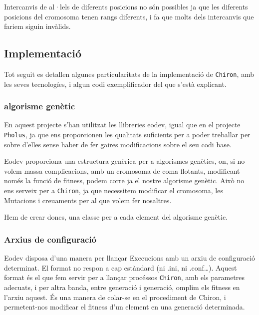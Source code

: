 Intercanvis de al·lels de diferents posicions no són possibles ja que les
diferents posicions del cromosoma tenen rangs diferents, i fa que molts dels
intercanvis que fariem siguin invàlids.


\subsection{Implementació} %
	\label{sub:Implementacio}

Tot seguit es detallen algunes particularitats de la implementació de
\texttt{Chiron}, amb les seves tecnologíes, i algun codi exemplificador del que
s'està explicant.

\subsubsection{algorisme genètic} %
\label{ssub:algorisme genetic}

En aquest projecte s'han utilitzat les llibreries eodev, igual que en el
projecte \texttt{Pholus}, ja que ens proporcionen les qualitats suficients per a
poder treballar per sobre d'elles sense haber de fer gaires modificacions sobre
el seu codi base.

Eodev proporciona una estructura genèrica per a algorismes genètics, on, si no
volem massa complicacions, amb un cromosoma de coma flotants, modificant només
la funció de fitness, podem corre ja el nostre algorisme genètic.  Això no ens
serveix per a \texttt{Chiron}, ja que necessitem modificar el cromosoma, les
Mutacions i creuaments per al que volem fer nosaltres.

Hem de crear doncs, una classe per a cada element del algorisme genètic.



\subsubsection{Arxius de configuració} %
\label{ssub:Arxius de configuracio}

Eodev disposa d'una manera per llançar Execucions amb un arxiu de configuració
determinat.  El format no respon a cap estàndard (ni .ini, ni .conf\ldots).
Aquest format és el que fem servir per a llançar procéssos \texttt{Chiron}, amb
els parametres adecuats, i per altra banda, entre generació i generació, omplim
els fitness en l'arxiu aquest.  És una manera de colar-se en el procediment de
Chiron, i permetent-nos modificar el fitness d'un element en una generació
determinada.

